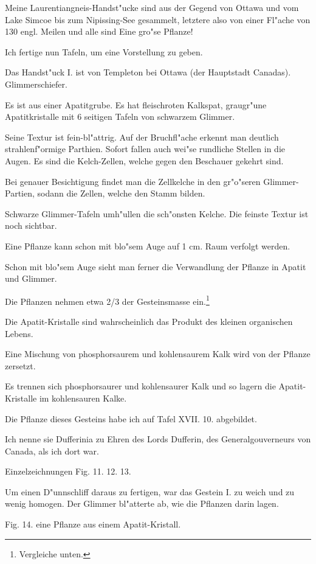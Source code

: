 \documentclass[a4paper, 11pt, oneside, german]{article}
\begin{document}
Meine Laurentiangneis-Handst"ucke sind aus der Gegend von Ottawa und vom Lake Simcoe bis zum Nipissing-See gesammelt, letztere also von einer Fl"ache von 130 engl. Meilen und alle sind Eine gro"se Pflanze!

Ich fertige nun Tafeln, um eine Vorstellung zu geben.

Das Handst"uck I. ist von Templeton bei Ottawa (der Hauptstadt Canadas). Glimmerschiefer.

Es ist aus einer Apatitgrube. Es hat fleischroten Kalkspat, graugr"une Apatitkristalle mit 6 seitigen Tafeln von schwarzem Glimmer.

Seine Textur ist fein-bl"attrig. Auf der Bruchfl"ache erkennt man deutlich strahlenf"ormige Parthien. Sofort fallen auch wei"se rundliche Stellen in die Augen. Es sind die Kelch-Zellen, welche gegen den Beschauer gekehrt sind.

Bei genauer Besichtigung findet man die Zellkelche in den gr"o"seren Glimmer-Partien, sodann die Zellen, welche den Stamm bilden.

Schwarze Glimmer-Tafeln umh"ullen die sch"onsten Kelche. Die feinste Textur ist noch sichtbar.

Eine Pflanze kann schon mit blo"sem Auge auf 1 cm. Raum verfolgt werden.

Schon mit blo"sem Auge sieht man ferner die Verwandlung der Pflanze in Apatit und Glimmer.

Die Pflanzen nehmen etwa 2/3 der Gesteinsmasse ein.\footnote{Vergleiche unten.}

Die Apatit-Kristalle sind wahrscheinlich das Produkt des kleinen organischen Lebens.

Eine Mischung von phosphorsaurem und kohlensaurem Kalk wird von der Pflanze zersetzt.

Es trennen sich phosphorsaurer und kohlensaurer Kalk und so lagern die Apatit-Kristalle im kohlensauren Kalke.

Die Pflanze dieses Gesteins habe ich auf Tafel XVII. 10. abgebildet.

Ich nenne sie Dufferinia zu Ehren des Lords Dufferin, des Generalgouverneurs von Canada, als ich dort war.

Einzelzeichnungen Fig. 11. 12. 13.

Um einen D"unnschliff daraus zu fertigen, war das Gestein I. zu weich und zu wenig homogen. Der Glimmer bl"atterte ab, wie die Pflanzen darin lagen.

Fig. 14. eine Pflanze aus einem Apatit-Kristall.
\end{document}
